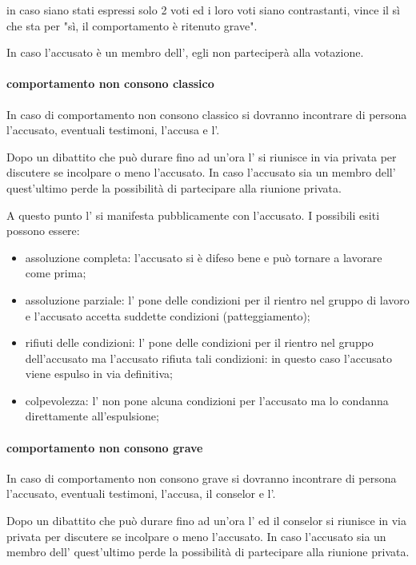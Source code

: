 in caso siano stati espressi solo 2 voti ed i loro voti siano contrastanti, vince il sì che sta per "sì, il comportamento è ritenuto grave".

In caso l'accusato è un membro dell'\EC{}, egli non parteciperà alla votazione.

\paragraph{comportamento non consono classico}

In caso di comportamento non consono classico si dovranno incontrare di persona l'accusato, eventuali testimoni, l'accusa e l'\EC{}.

Dopo un dibattito che può durare fino ad un'ora l'\EC{} si riunisce in via privata per discutere se incolpare o meno l'accusato. In caso l'accusato sia un membro dell'\EC{} quest'ultimo perde la possibilità di partecipare alla riunione privata.

A questo punto l'\EC{} si manifesta pubblicamente con l'accusato.
I possibili esiti possono essere:
\begin{itemize}
	\item assoluzione completa: l'accusato si è difeso bene e può tornare a lavorare come prima;
	\item assoluzione parziale: l'\EC{} pone delle condizioni per il rientro nel gruppo di lavoro e l'accusato accetta suddette condizioni (patteggiamento);
	\item rifiuti delle condizioni: l'\EC{} pone delle condizioni per il rientro nel gruppo dell'accusato ma l'accusato rifiuta tali condizioni: in questo caso l'accusato viene espulso in via definitiva;
	\item colpevolezza: l'\EC{} non pone alcuna condizioni per l'accusato ma lo condanna direttamente all'espulsione;
\end{itemize}

\paragraph{comportamento non consono grave}

In caso di comportamento non consono grave si dovranno incontrare di persona l'accusato, eventuali testimoni, l'accusa, il conselor  e l'\EC{}.

Dopo un dibattito che può durare fino ad un'ora l'\EC{} ed il conselor si riunisce in via privata per discutere se incolpare o meno l'accusato. In caso l'accusato sia un membro dell'\EC{} quest'ultimo perde la possibilità di partecipare alla riunione privata.

